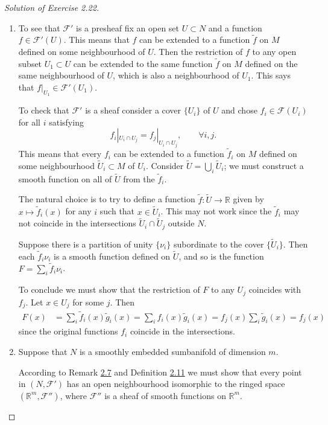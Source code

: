 \begin{proof}[Solution of Exercise 2.22]\leavevmode
\begin{enumerate}[label=(\alph*)]
\item To see that $\mathcal{F}'$ is a presheaf fix an open set $U\subset N$ and a function $f \in \mathcal{F}'(U)$. This means that $f$ can be extended to a function $\tilde{f}$ on $M$ defined on some neighbourhood of $U$. Then the restriction of $f $ to any open subset  $U_1 \subset U$ can be extended to the same function \(\tilde{f}\) on $M$ defined on the same neighbourhood of $U$, which is also a neighbourhood of $U_1$. This says that $f|_{U_1}\in\mathcal{F}'(U_1)$.

	To check that $\mathcal{F}'$ is a sheaf consider a cover $ \{ U_i\}$ of $U$ and chose $f_i \in \mathcal{F}(U_i)$ for all $i$ satisfying
	\[f_i|_{U_i\cap U_j}=f_j|_{U_i \cap U_j},\qquad \forall i,j.\]
	This means that every $f_i$ can be extended to a function $\tilde{f}_i$ on $M$ defined on some neighbourhood $\tilde{U}_i \subset M$ of $U_i$. Consider $\tilde{U}=\bigcup_{i} \tilde{U}_i$; we must construct a smooth function on all of \(\tilde{U}\) from the \(\tilde{f}_i\).
	
	The natural choice is to try to define a function $\tilde{f}:\tilde{U}\to \mathbb{R}$ given by $x\mapsto \tilde{f}_i(x)$ for any $i$ such that $x \in \tilde{U}_i$. This may not work since the \(\tilde{f}_i\) may not coincide in the intersections \(\tilde{U}_i\cap \tilde{U}_j\) outside $N$.

	{\color{2}Suppose there is a partition of unity} \(\{\nu_i\}\) subordinate to the cover \(\{\tilde{U}_i\}\). Then each \(\tilde{f}_i\nu_i\) is a smooth function defined on \(\tilde{U}\), and so is the function \(F=\sum_i \tilde{f}_i\nu_i\).

	To conclude we must show that the restriction of \(F\) to any \(U_j\) coincides with \(f_j\). Let \(x \in U_j\) for some $j$. Then
	\begin{align*}
	F(x)&=\sum_i\tilde{f}_i(x)\tilde{g}_i(x)=\sum_if_i(x)\tilde{g}_i(x)=f_j(x)\sum_i\tilde{g}_i(x)=f_j(x)
	\end{align*}
since the original functions \(f_i\) coincide in the intersections.
	\item Suppose that $N$ is a smoothly embedded sumbanifold of dimension $m$.

According to Remark \hyperref[rk:2.7]{2.7} and Definition \hyperref[def:2.11]{2.11} we must show that every point in \((N,\mathcal{F}')\) has an open neighbourhood isomorphic to the ringed space \((\mathbb{R}^m,\mathcal{F}'')\), where \(\mathcal{F}''\) is a sheaf of smooth functions on \(\mathbb{R}^m\).


\end{enumerate}
\end{proof}

